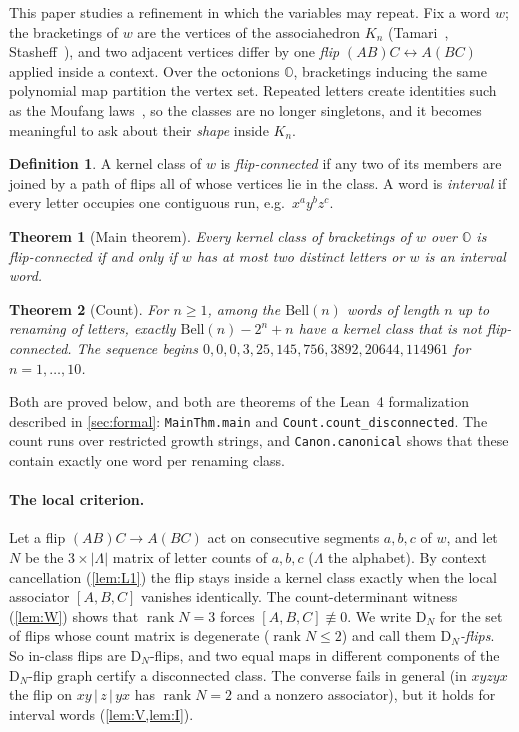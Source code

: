 \documentclass[11pt,a4paper]{article}
\newtheorem{theorem}{Theorem}
\theoremstyle{definition}
\newtheorem{definition}[thm]{Definition}
\theoremstyle{remark}
\newcommand{\OO}{\mathbb{O}}
\newcommand{\assoc}[3]{[#1,#2,#3]}
\newcommand{\DN}{\mathrm{D}_N}
\newcommand{\lean}[1]{\texttt{#1}}
\newcommand{\Bell}{\mathrm{Bell}}
\DeclareMathOperator{\rank}{rank}
\begin{document}
This paper studies a refinement in which the variables may repeat. Fix a word $w$; the bracketings of
$w$ are the vertices of the associahedron $K_n$ (Tamari~\cite{Tam62}, Stasheff~\cite{Sta63}), and two
adjacent vertices differ by one \emph{flip} $(AB)C\leftrightarrow A(BC)$ applied inside a context. Over
the octonions $\OO$, bracketings inducing the same polynomial map partition the vertex set. Repeated
letters create identities such as the Moufang laws~\cite{Mou35}, so the classes are no longer singletons,
and it becomes meaningful to ask about their \emph{shape} inside $K_n$.

\begin{definition}
A kernel class of $w$ is \emph{flip-connected} if any two of its members are joined by a path of flips
all of whose vertices lie in the class. A word is \emph{interval} if every letter occupies one
contiguous run, e.g.\ $x^ay^bz^c$.
\end{definition}

\begin{theorem}[Main theorem]\label{thm:main}
Every kernel class of bracketings of $w$ over $\OO$ is flip-connected if and only if $w$ has at most two
distinct letters or $w$ is an interval word.
\end{theorem}

\begin{theorem}[Count]\label{thm:count}
For $n\ge1$, among the $\Bell(n)$ words of length $n$ up to renaming of letters, exactly
$\Bell(n)-2^n+n$ have a kernel class that is not flip-connected. The sequence begins
$0,0,0,3,25,145,756,3892,20644,114961$ for $n=1,\dots,10$.
\end{theorem}

Both are proved below, and both are theorems of the Lean~4 formalization described in
\cref{sec:formal}: \lean{MainThm.main} and \lean{Count.count\_disconnected}. The count runs over
restricted growth strings, and \lean{Canon.canonical} shows that these contain exactly one word per
renaming class.

\paragraph{The local criterion.} Let a flip $(AB)C\to A(BC)$ act on consecutive segments $a,b,c$ of $w$,
and let $N$ be the $3\times\lvert\Lambda\rvert$ matrix of letter counts of $a,b,c$ ($\Lambda$ the
alphabet). By context cancellation (\cref{lem:L1}) the flip stays inside a kernel class exactly when the
local associator $\assoc ABC$ vanishes identically. The count-determinant witness (\cref{lem:W}) shows
that $\rank N=3$ forces $\assoc ABC\not\equiv0$. We write $\DN$ for the set of flips whose count matrix is
degenerate ($\rank N\le2$) and call them \emph{$\DN$-flips}. So in-class flips are $\DN$-flips, and two
equal maps in different components of the $\DN$-flip graph certify a disconnected class. The converse
fails in general (in $xyzyx$ the flip on $xy\,|\,z\,|\,yx$ has $\rank N=2$ and a nonzero associator), but
it holds for interval words (\cref{lem:V,lem:I}).
\end{document}
